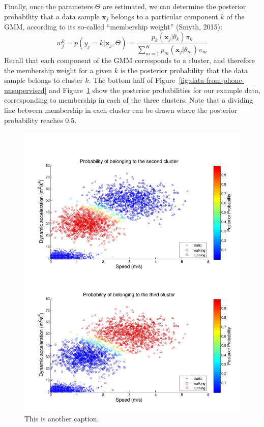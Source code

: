 Finally, once the parameters $\Theta$ are estimated, we can determine the posterior probability that a data sample $\mathbf{x}_j$ belongs to a particular component $k$ of the GMM, according to its so-called ``membership weight'' (Smyth, 2015):
%
\begin{equation}
  w_j^k = p(y_j = k|\mathbf{x}_j, \Theta) =  \frac{p_k(\mathbf{x}_j|\theta_k) \pi_k}{ \sum_{m=1}^K p_m(\mathbf{x}_j|\theta_m) \pi_m }
\end{equation}
%
Recall that each component of the GMM corresponds to a cluster, and therefore the membership weight for a given $k$ is the posterior probability that the data sample belongs to cluster $k$. The bottom half of Figure~\ref{fig:data-from-phone-unsupervised} and Figure~\ref{fig:data-from-phone-unsupervised2} show the posterior probabilities for our example data, corresponding to membership in each of the three clusters. Note that a dividing line between membership in each cluster can be drawn where the posterior probability reaches 0.5.
%
\begin{figure}
  \begin{center}
    \includegraphics[width=1.0\textwidth]{figChapter3-3}
  \end{center}
  \caption[Data from smartphone]{This is another caption.}
  \label{fig:data-from-phone-unsupervised2}
\end{figure}
%

